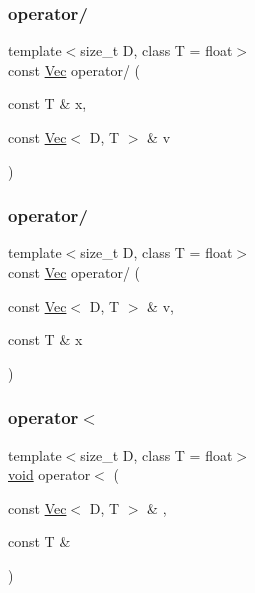 \subsubsection{\texorpdfstring{operator/}{operator/}\hspace{0.1cm}{\footnotesize\ttfamily [1/2]}}
{\footnotesize\ttfamily template$<$size\+\_\+t D, class T = float$>$ \\
const \hyperlink{classtrimesh_1_1Vec}{Vec} operator/ (\begin{DoxyParamCaption}\item[{const T \&}]{x,  }\item[{const \hyperlink{classtrimesh_1_1Vec}{Vec}$<$ D, T $>$ \&}]{v }\end{DoxyParamCaption})\hspace{0.3cm}{\ttfamily [friend]}}

\mbox{\label{classtrimesh_1_1Vec_ac9015a7c1a54407b1dabed7b7ebc536a}} 
\subsubsection{\texorpdfstring{operator/}{operator/}\hspace{0.1cm}{\footnotesize\ttfamily [2/2]}}
{\footnotesize\ttfamily template$<$size\+\_\+t D, class T = float$>$ \\
const \hyperlink{classtrimesh_1_1Vec}{Vec} operator/ (\begin{DoxyParamCaption}\item[{const \hyperlink{classtrimesh_1_1Vec}{Vec}$<$ D, T $>$ \&}]{v,  }\item[{const T \&}]{x }\end{DoxyParamCaption})\hspace{0.3cm}{\ttfamily [friend]}}

\mbox{\label{classtrimesh_1_1Vec_a2696c58b327e6affbb8f068557d7c05b}} 
\subsubsection{\texorpdfstring{operator$<$}{operator<}\hspace{0.1cm}{\footnotesize\ttfamily [1/2]}}
{\footnotesize\ttfamily template$<$size\+\_\+t D, class T = float$>$ \\
\hyperlink{namespacetrimesh_a784ddfd979e1c579bda795a8edfc3f43}{void} operator$<$ (\begin{DoxyParamCaption}\item[{const \hyperlink{classtrimesh_1_1Vec}{Vec}$<$ D, T $>$ \&}]{,  }\item[{const T \&}]{ }\end{DoxyParamCaption})\hspace{0.3cm}{\ttfamily [friend]}}


